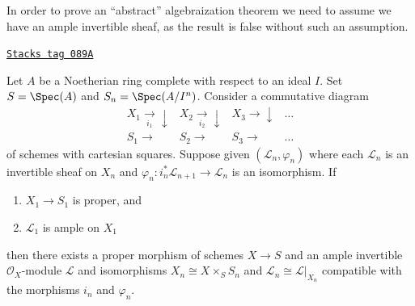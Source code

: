 In order to prove an ``abstract'' algebraization theorem we need
to assume we have an ample invertible sheaf, as the result is false
without such an assumption.

\begin{theorem}

\label{coherent-theorem-algebraization}
\href{https://stacks.math.columbia.edu/tag/089A}{\texttt{Stacks tag 089A}}

Let $A$ be a Noetherian ring complete with respect to an ideal $I$.
Set $S = \Spec(A)$ and $S_n = \Spec(A/I^n)$. Consider a commutative
diagram
$$
\begin{array}{cccc}X_1 \underset{i_1}{\longrightarrow}\downarrow & X_2 \underset{i_2}{\longrightarrow}\downarrow & X_3 \longrightarrow\downarrow & \ldots \\ S_1 \longrightarrow & S_2 \longrightarrow & S_3 \longrightarrow & \ldots\end{array}
$$
of schemes with cartesian squares. Suppose given $(\mathcal{L}_n, \varphi_n)$
where each $\mathcal{L}_n$ is an invertible sheaf on $X_n$ and
$\varphi_n : i_n^*\mathcal{L}_{n + 1} \to \mathcal{L}_n$
is an isomorphism. If
\begin{enumerate}
\item $X_1 \to S_1$ is proper, and
\item $\mathcal{L}_1$ is ample on $X_1$
\end{enumerate}
then there exists a proper morphism of schemes $X \to S$
and an ample invertible $\mathcal{O}_X$-module $\mathcal{L}$
and isomorphisms $X_n \cong X \times_S S_n$ and
$\mathcal{L}_n \cong \mathcal{L}|_{X_n}$ compatible with
the morphisms $i_n$ and $\varphi_n$.
\end{theorem}

